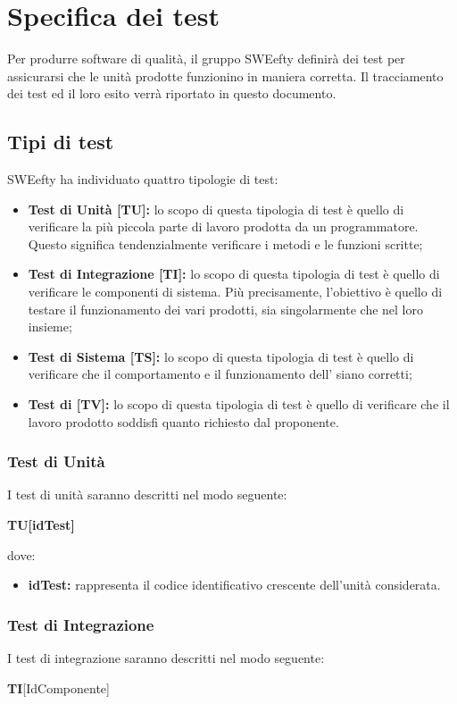 \section{Specifica dei test}
Per produrre software di qualità, il gruppo SWEefty definirà dei test per assicurarsi che le unità prodotte funzionino in maniera corretta. Il tracciamento dei test ed il loro esito verrà riportato in questo documento.
	\subsection{Tipi di test}
	SWEefty ha individuato quattro tipologie di test:
	\begin{itemize}
		\item {\textbf{Test di Unità [TU]:} lo scopo di questa tipologia di test è quello di verificare la più piccola parte di lavoro prodotta da un programmatore. Questo significa tendenzialmente verificare i metodi e le funzioni scritte; }
		\item {\textbf{Test di Integrazione [TI]:} lo scopo di questa tipologia di test è quello di verificare le componenti di sistema. Più	precisamente, l’obiettivo è quello di testare il funzionamento dei vari  prodotti, sia singolarmente che nel loro insieme; }
		\item {\textbf{Test di Sistema [TS]:} lo scopo di questa tipologia di test è quello di verificare che il comportamento e il funzionamento dell’ siano corretti;}
		\item {\textbf{Test di  [TV]:} lo scopo di questa tipologia di test è quello di verificare che il lavoro prodotto soddisfi quanto richiesto dal proponente. }
	\end{itemize} 
		
	\subsubsection{Test di Unità}
	I test di unità saranno descritti nel modo seguente: \Spazio

	\centerline{\textbf{TU[idTest]}}
	
	dove:
	\begin{itemize}
		\item \textbf{idTest:} rappresenta il codice identificativo crescente dell’unità considerata.
	\end{itemize}
	
	\subsubsection{Test di Integrazione}
	I test di integrazione saranno descritti nel modo seguente: \Spazio
	\centerline{\textbf{TI}[IdComponente]}
	
